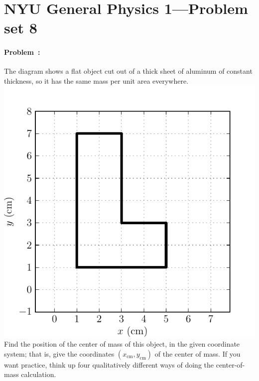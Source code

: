\documentclass[12pt]{article}
\newcounter{problem}
\begin{document}
\thispagestyle{empty}

\section*{NYU General Physics 1---Problem set 8}

\paragraph{Problem~\theproblem:}%
The diagram shows a flat object cut out of a thick sheet of aluminum
of constant thickness, so it has the same mass per unit area
everywhere.\\\includegraphics{../py/com_shape.pdf}\\Find the position
of the center of mass of this object, in the given coordinate system;
that is, give the coordinates $(x_\mathrm{cm}, y_\mathrm{cm})$ of the
center of mass.  If you want practice, think up four qualitatively
different ways of doing the center-of-mass calculation.
\end{document}

